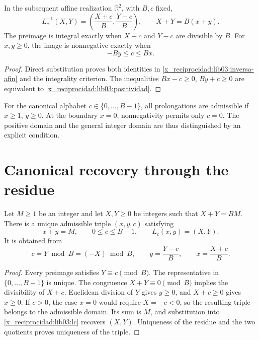 \begin{proposition}
\label{x_reciprocidad:lib03:prop-inversa}
In the subsequent affine realization \(\mathbb R^2\), with \(B,c\) fixed,
\begin{equation}
 L_c^{-1}(X,Y)=\left(\frac{X+c}{B},\frac{Y-c}{B}\right),\qquad
 X+Y=B(x+y).
 \label{x_reciprocidad:lib03:inversa-afin}
\end{equation}
The preimage is integral exactly when \(X+c\) and \(Y-c\) are
divisible by \(B\). For \(x,y\geq0\), the image is nonnegative
exactly when
\begin{equation}
 -By\leq c\leq Bx.
 \label{x_reciprocidad:lib03:positividad}
\end{equation}
\end{proposition}

\begin{proof}
Direct substitution proves both identities in
\eqref{x_reciprocidad:lib03:inversa-afin} and the integrality criterion. The
inequalities \(Bx-c\geq0\), \(By+c\geq0\) are equivalent to
\eqref{x_reciprocidad:lib03:positividad}.
\end{proof}

For the canonical alphabet \(c\in\{0,\ldots,B-1\}\), all
prolongations are admissible if \(x\geq1\), \(y\geq0\). At the
boundary \(x=0\), nonnegativity permits only \(c=0\).
The positive domain and the general integer domain are thus
distinguished by an explicit condition.

\section{Canonical recovery through the residue}
\label{x_reciprocidad:lib03:residuo}

\begin{theorem}
\label{x_reciprocidad:lib03:teo-residuo}
Let \(M\geq1\) be an integer and let \(X,Y\geq0\) be integers such that
\(X+Y=BM\). There is a unique admissible triple \((x,y,c)\) satisfying
\[
 x+y=M,\qquad 0\leq c\leq B-1,\qquad L_c(x,y)=(X,Y).
\]
It is obtained from
\begin{equation}
 c=Y\bmod B=(-X)\bmod B,\qquad
 y=\frac{Y-c}{B},\qquad x=\frac{X+c}{B}.
 \label{x_reciprocidad:lib03:residuo-inversor}
\end{equation}
\end{theorem}

\begin{proof}
Every preimage satisfies \(Y\equiv c\pmod B\). The representative in
\(\{0,\ldots,B-1\}\) is unique. The congruence \(X+Y\equiv0\pmod B\)
implies the divisibility of \(X+c\). Euclidean division of \(Y\)
gives \(y\geq0\), and \(X+c\geq0\) gives \(x\geq0\). If
\(c>0\), the case \(x=0\) would require \(X=-c<0\), so the
resulting triple belongs to the admissible domain. Its sum is \(M\), and
substitution into \eqref{x_reciprocidad:lib03:lc} recovers \((X,Y)\). Uniqueness
of the residue and the two quotients proves uniqueness of the triple.
\end{proof}

